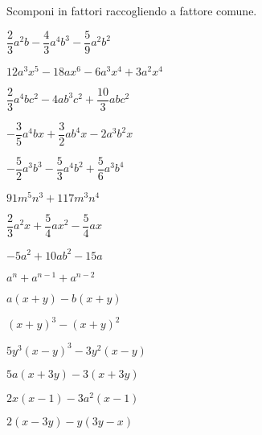 

\begin{esercizio}
\label{ese:div.011}
Scomponi in fattori raccogliendo a fattore comune.
\begin{multicols}{2}
\begin{enumeratea}
 \item \(\dfrac{2}{3}a^{2}b-\dfrac{4}{3}a^{4}b^{3}-\dfrac{5}{9}a^{2}b^{2}\)
 \item \(12a^{3}x^{5}-18ax^{6}-6a^{3}x^{4}+3a^{2}x^{4}\)
 \item \(\dfrac{2}{3}a^{4}bc^{2}-4ab^{3}c^{2}+\dfrac{10}{3}abc^{2}\)
 \item \(-{\dfrac{3}{5}}a^{4}bx+\dfrac{3}{2}ab^{4}x-2a^{3}b^{2}x\)
 \item \(-{\dfrac{5}{2}}a^{3}b^{3}-\dfrac{5}{3}a^{4}b^{2}+\dfrac{5}{6}a^{3}b^{4}\)
 \item \(91m^{5}n^{3}+117m^{3}n^{4}\)
 \item \(\dfrac{2}{3}a^{2}x+\dfrac{5}{4}ax^{2}-\dfrac{5}{4}ax\)
 \item \(-5a^{2}+10ab^{2}-15a\)
 \item \(a^{n}+a^{n-1}+a^{n-2}\)
 \item \(a(x+y)-b(x+y)\)
 \item \((x+y)^{3}-(x+y)^{2}\)
 \item \(5y^{3}(x-y)^{3}-3y^{2}(x-y)\)
 \item \(5a(x+3y)-3(x+3y)\)
 \item \(2x(x-1)-3a^{2}(x-1)\)
 \item \(2(x-3y)-y(3y-x)\)
\end{enumeratea}
\end{multicols}
\end{esercizio}


